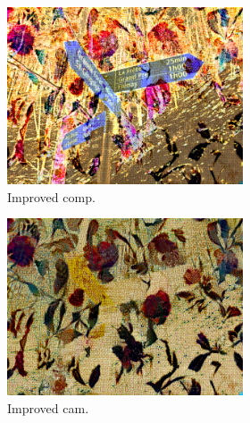 \begin{figure}[]
\begin{subfigure}{\textwidth}
        \begin{subfigure}{0.24\textwidth}
            \centering
            \includegraphics[width=\textwidth]{images/04-experiment02/photo/flowers2/improved_im.jpg}
            \caption*{Improved comp.}
        \end{subfigure}
        \hfill
        \begin{subfigure}{0.24\textwidth}
            \centering
            \includegraphics[width=\textwidth]{images/04-experiment02/photo/flowers2/improved_proj.jpg}
            \caption*{Improved cam.}
        \end{subfigure}
        \hfill
        \begin{subfigure}{0.24\textwidth}
            \centering

\end{subfigure}
\end{subfigure}
\end{figure}
